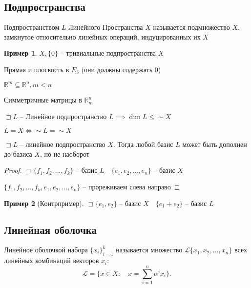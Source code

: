 \documentclass{book}
\newcommand\R{\ensuremath{\mathbb{R}}}
\theoremstyle{definition}
\newtheorem*{example}{Пример}
\begin{document}
\subsection{Подпространства}

\begin{definition}
    Подпространством $L$ Линейного Пространства  $X$ называется подмножество  $X$, замкнутое относительно линейных операций, индуцированных их  $X$ 
\end{definition}

\begin{example}
    $X, \{0\}$ -- тривиальные подпространства  $X$ 

    Прямая и плоскость в $E_3$ (они должны содержать  $0$)

     $\R^m \subseteq \R^n, m<n$

     Симметричные матрицы в $\R^n_m$
\end{example}

\begin{lemma}
    $\sqsupset L$ -- Линейное подпространство $L \implies \dim L \leqslant \sim X$
\end{lemma}
\begin{lemma}
    $L=X \iff \sim L = \sim X$
\end{lemma}
\begin{lemma}
    $\sqsupset L$ -- линейное подпространство $X$. Тогда любой базис  $L$ может быть дополнен до базиса  $X$, но не наоборот
\end{lemma}
\begin{proof}
    $\sqsupset \{f_1, f_2, \ldots, f_k\}$ -- базис $L\quad \{ e_1, e_2, \ldots, e_n\}$ -- базис $X$ 

    $\{f_1, f_2, \ldots, f_k, e_1, e_2, \ldots, e_n\}$ -- прореживаем слева направо
\end{proof}

\begin{example}
    [Контрпример]

    $\sqsupset \{e_1, e_2\}$ -- базис $X\quad\{e_1+e_2\}$ -- базис $L$
\end{example}

\subsection{Линейная оболочка}

\begin{definition}
    Линейное оболочкой набора $\{x_i\}_{i=1}^k$ называется множество $\mathscr{L}\{x_1, x_2, \ldots, x_n\}$ всех линейных комбинаций векторов $x_i:$  \[
        \mathscr{L} = \{x\in X:\quad x = \sum_{i=1}^{n} \alpha^ix_i\}
    .\] 
\end{definition}
\end{document}
